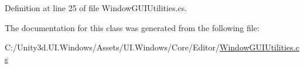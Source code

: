 Definition at line 25 of file Window\+G\+U\+I\+Utilities.\+cs.



The documentation for this class was generated from the following file\+:\begin{DoxyCompactItemize}
\item 
C\+:/\+Unity3d.\+U\+I.\+Windows/\+Assets/\+U\+I.\+Windows/\+Core/\+Editor/\hyperlink{_window_g_u_i_utilities_8cs}{Window\+G\+U\+I\+Utilities.\+cs}\end{DoxyCompactItemize}
